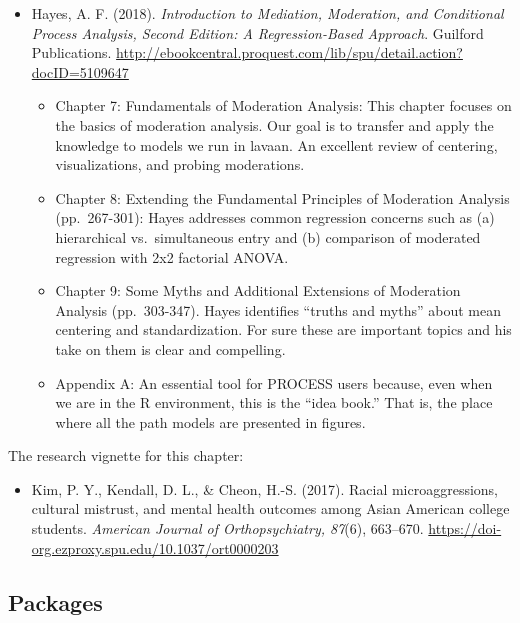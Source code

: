\documentclass[
  11pt,
]{book}
\providecommand{\tightlist}{%
  \setlength{\itemsep}{0pt}\setlength{\parskip}{0pt}}
\begin{document}
\begin{itemize}
\tightlist
\item
  Hayes, A. F. (2018). \emph{Introduction to Mediation, Moderation, and Conditional Process Analysis, Second Edition: A Regression-Based Approach}. Guilford Publications. \url{http://ebookcentral.proquest.com/lib/spu/detail.action?docID=5109647}

  \begin{itemize}
  \tightlist
  \item
    Chapter 7: Fundamentals of Moderation Analysis: This chapter focuses on the basics of moderation analysis. Our goal is to transfer and apply the knowledge to models we run in lavaan. An excellent review of centering, visualizations, and probing moderations.
  \item
    Chapter 8: Extending the Fundamental Principles of Moderation Analysis (pp.~267-301): Hayes addresses common regression concerns such as (a) hierarchical vs.~simultaneous entry and (b) comparison of moderated regression with 2x2 factorial ANOVA.
  \item
    Chapter 9: Some Myths and Additional Extensions of Moderation Analysis (pp.~303-347). Hayes identifies ``truths and myths'' about mean centering and standardization. For sure these are important topics and his take on them is clear and compelling.
  \item
    Appendix A: An essential tool for PROCESS users because, even when we are in the R environment, this is the ``idea book.'' That is, the place where all the path models are presented in figures.
  \end{itemize}
\end{itemize}

The research vignette for this chapter:

\begin{itemize}
\tightlist
\item
  Kim, P. Y., Kendall, D. L., \& Cheon, H.-S. (2017). Racial microaggressions, cultural mistrust, and mental health outcomes among Asian American college students. \emph{American Journal of Orthopsychiatry, 87}(6), 663--670. \url{https://doi-org.ezproxy.spu.edu/10.1037/ort0000203}
\end{itemize}

\hypertarget{packages-7}{%
\subsection{Packages}\label{packages-7}}
\end{document}
